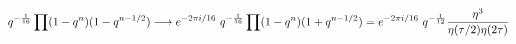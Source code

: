\begin{equation}
  q^{-{1\over 16}} \prod(1-q^n)(1-q^{n-1/2}) \longrightarrow e^{-2\pi
  i/16}~ q^{-{1\over 16}} \prod(1-q^n)(1+q^{n-1/2}) = e^{-2\pi
  i/16}~ q^{-{1\over 12}} {\eta^3\over \eta(\tau/2) \eta(2\tau)}
\end{equation}


